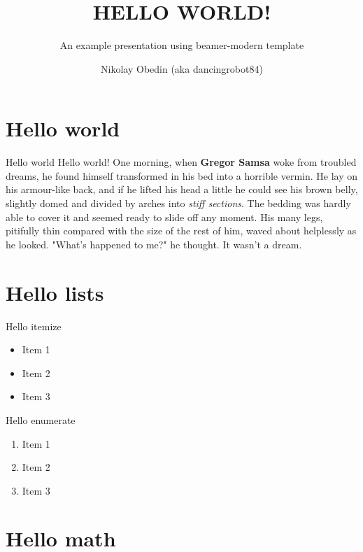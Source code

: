 \documentclass[xetex]{beamer}
\title
    {HELLO WORLD!}
\subtitle
    {An example presentation using beamer-modern template}
\author
    {Nikolay Obedin (aka dancingrobot84)}
\begin{document}
    \frame[plain]{\titlepage}

    \frame{\tableofcontents}

    \section{Hello world}

    \begin{frame}{Hello world}
        Hello world! One morning, when \textbf{Gregor Samsa}
        woke from troubled dreams, he found himself
        transformed in his bed into a horrible vermin.
        He lay on his armour-like back, and if he
        lifted his head a little he could see his brown
        belly, slightly domed and divided by arches
        into \textit{stiff sections}. The bedding was hardly
        able to cover it and seemed ready to slide off
        any moment. His many legs, pitifully thin
        compared with the size of the rest of him,
        waved about helplessly as he looked. "What's
        happened to me?" he thought. It wasn't a dream.
    \end{frame}

    \section{Hello lists}

    \begin{frame}{Hello itemize}
        \begin{itemize}
            \item Item 1
            \item Item 2
            \item Item 3
        \end{itemize}
    \end{frame}

    \begin{frame}{Hello enumerate}
        \begin{enumerate}
            \item Item 1
            \item Item 2
            \item Item 3
        \end{enumerate}
    \end{frame}

    \section{Hello math}
\end{document}
